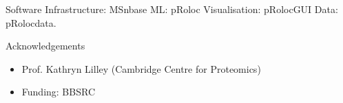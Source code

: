\documentclass[bigger]{beamer}
\newcommand{\Rpackage}[1]{{\mbox{\normalfont\textsf{#1}}}}
\begin{document}
  \begin{frame}

   \begin{block}{Software}
     \vspace{.1cm}
     Infrastructure: \Rpackage{MSnbase} \newline
     ML: \Rpackage{pRoloc} \newline
     Visualisation: \Rpackage{pRolocGUI} \newline
     Data: \Rpackage{pRolocdata}.
    \vspace{.2cm}
  \end{block}

  \begin{block}{Acknowledgements}
    \begin{itemize}
    \item Prof. Kathryn Lilley (Cambridge Centre for Proteomics)
    \item Funding: BBSRC
    \end{itemize}
  \end{block}


  \end{frame}
\end{document}
